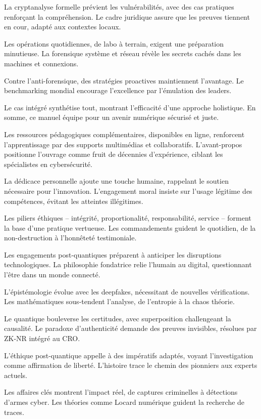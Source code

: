 \documentclass[a4paper,12pt]{extarticle}
\begin{document}
La cryptanalyse formelle prévient les vulnérabilités, avec des cas pratiques renforçant la compréhension. Le cadre juridique assure que les preuves tiennent en cour, adapté aux contextes locaux.

Les opérations quotidiennes, de labo à terrain, exigent une préparation minutieuse. La forensique système et réseau révèle les secrets cachés dans les machines et connexions.

Contre l'anti-forensique, des stratégies proactives maintiennent l'avantage. Le benchmarking mondial encourage l'excellence par l'émulation des leaders.

Le cas intégré synthétise tout, montrant l'efficacité d'une approche holistique. En somme, ce manuel équipe pour un avenir numérique sécurisé et juste.


Les ressources pédagogiques complémentaires, disponibles en ligne, renforcent l'apprentissage par des supports multimédias et collaboratifs. L'avant-propos positionne l'ouvrage comme fruit de décennies d'expérience, ciblant les spécialistes en cybersécurité.

La dédicace personnelle ajoute une touche humaine, rappelant le soutien nécessaire pour l'innovation. L'engagement moral insiste sur l'usage légitime des compétences, évitant les atteintes illégitimes.

Les piliers éthiques – intégrité, proportionalité, responsabilité, service – forment la base d'une pratique vertueuse. Les commandements guident le quotidien, de la non-destruction à l'honnêteté testimoniale.

Les engagements post-quantiques préparent à anticiper les disruptions technologiques. La philosophie fondatrice relie l'humain au digital, questionnant l'être dans un monde connecté.

L'épistémologie évolue avec les deepfakes, nécessitant de nouvelles vérifications. Les mathématiques sous-tendent l'analyse, de l'entropie à la chaos théorie.

Le quantique bouleverse les certitudes, avec superposition challengeant la causalité. Le paradoxe d'authenticité demande des preuves invisibles, résolues par ZK-NR intégré au CRO.

L'éthique post-quantique appelle à des impératifs adaptés, voyant l'investigation comme affirmation de liberté. L'histoire trace le chemin des pionniers aux experts actuels.

Les affaires clés montrent l'impact réel, de captures criminelles à détections d'armes cyber. Les théories comme Locard numérique guident la recherche de traces.
\end{document}
